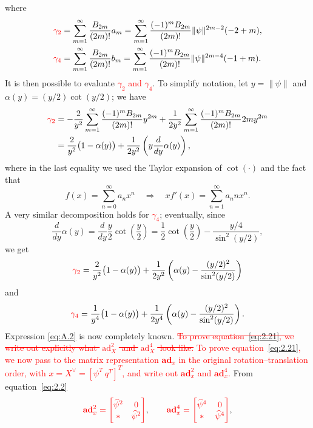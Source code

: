 \documentclass[11pt]{article}
\newcommand{\rev}[1]{\textcolor{red}{#1}}
\newcommand{\del}[1]{\textcolor{red}{\sout{#1}}}
\newcommand{\bad}{\mathbf{ad}}
\newcommand{\ad}{\operatorname{ad}}
\begin{document}
where
\begin{align*}
\rev{\gamma_2}&=\sum_{m=1}^{\infty}\frac{B_{2m}}{(2m)!}a_m
=\sum_{m=1}^{\infty}\frac{(-1)^mB_{2m}}{(2m)!}\|\psi\|^{2m-2}(-2+m),\\
\rev{\gamma_4}&=\sum_{m=1}^{\infty}\frac{B_{2m}}{(2m)!}b_m
=\sum_{m=1}^{\infty}\frac{(-1)^mB_{2m}}{(2m)!}\|\psi\|^{2m-4}(-1+m).
\end{align*}
It is then possible to evaluate \rev{$\gamma_2$ and $\gamma_4$}. To simplify notation, let $y=\|\psi\|$ and $\alpha(y)=(y/2)\cot(y/2)$; we have
\begin{align*}
\rev{\gamma_2}
&=-\frac{2}{y^2}\sum_{m=1}^{\infty}\frac{(-1)^mB_{2m}}{(2m)!}y^{2m}
+\frac{1}{2y^2}\sum_{m=1}^{\infty}\frac{(-1)^mB_{2m}}{(2m)!}2m y^{2m}\\
&=\frac{2}{y^2}\bigl(1-\alpha(y)\bigr)
+\frac{1}{2y^2}\left(y\frac{d}{dy}\alpha(y)\right),
\end{align*}
where in the last equality we used the Taylor expansion of $\cot(\cdot)$ and the fact that
\begin{equation*}
f(x)=\sum_{n=0}^{\infty}a_nx^n\quad\Rightarrow\quad xf'(x)=\sum_{n=1}^{\infty}a_nnx^n.
\end{equation*}
A very similar decomposition holds for \rev{$\gamma_4$}; eventually, since
\begin{equation*}
\frac{d}{dy}\alpha(y)=\frac{d}{dy}\frac y2\cot\left(\frac y2\right)
=\frac12\cot\left(\frac y2\right)-\frac{y/4}{\sin^2(y/2)},
\end{equation*}
we get
\begin{equation*}
\rev{\gamma_2}=\frac{2}{y^2}\bigl(1-\alpha(y)\bigr)
+\frac{1}{2y^2}\left(\alpha(y)-\frac{(y/2)^2}{\sin^2(y/2)}\right)
\end{equation*}
and
\begin{equation*}
\rev{\gamma_4}=\frac{1}{y^4}\bigl(1-\alpha(y)\bigr)
+\frac{1}{2y^4}\left(\alpha(y)-\frac{(y/2)^2}{\sin^2(y/2)}\right).
\end{equation*}
Expression \eqref{eq:A.2} is now completely known. \del{To prove equation~\eqref{eq:2.21}, we write out explicitly what $\ad_X^2$ and $\ad_X^4$ look like.} \rev{To prove equation~\eqref{eq:2.21}, we now pass to the matrix representation $\bad_x$ in the original rotation--translation order, with $x=X^\vee=[\psi^T\ q^T]^T$, and write out $\bad_x^2$ and $\bad_x^4$.} From equation~\eqref{eq:2.2}
\begin{equation*}
\rev{\bad_x^2=\begin{bmatrix}\widehat\psi^2&0\\ *&\widehat\psi^2\end{bmatrix}},
\qquad
\rev{\bad_x^4=\begin{bmatrix}\widehat\psi^4&0\\ *&\widehat\psi^4\end{bmatrix}},
\end{equation*}
\end{document}
